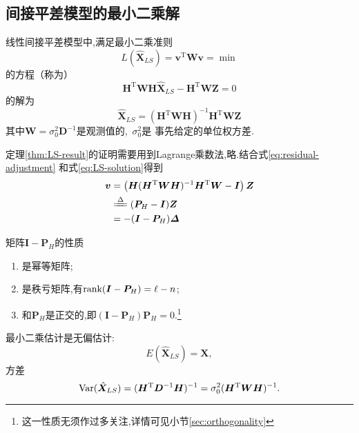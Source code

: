 \documentclass[cn,10pt,citestyle=gb7714-2015,bibstyle=gb7714-2015]{elegantbook}
\newcommand{\mT}{\mathrm{T}}
\renewcommand{\l}{\ell}
\newcommand{\rank}{\textup{rank}}
\newcommand{\Var}{\textup{Var}}
\begin{document}
\subsection{间接平差模型的最小二乘解}
\begin{theorem}[最小二乘解]\label{thm:LS-result}
  线性间接平差模型中,满足最小二乘准则
  \begin{equation}
    L(\hat{\bm{X}}_{LS})=\bm{v}^\mT\bm{W}\bm{v}=\min
  \end{equation}
  的方程（称为）
  \begin{equation}
    \bm{H}^\mT\bm{W}\bm{H}\hat{\bm{X}}_{LS}-\bm{H}^\mT\bm{W}\bm{Z}=0
  \end{equation}
  的解为
  \begin{equation}\label{eq:LS-solution}
    \hat{\bm{X}}_{LS}=(\bm{H}^\mT\bm{W}\bm{H})^{-1}\bm{H}^\mT\bm{W}\bm{Z}
  \end{equation}
  其中$\bm{W}=\sigma_0^2\bm{D}^{-1}$是观测值的,\ $\sigma_0^2$是
  事先给定的单位权方差.
\end{theorem}
定理\ref{thm:LS-result}的证明需要用到\textup{Lagrange}乘数法,略.结合式\eqref{eq:residual-adjustment}
和式\eqref{eq:LS-solution}得到
\begin{align*}
  \bm{v}&=\left(\bm{H}(\bm{H}^\mT\bm{W}\bm{H})^{-1}\bm{H}^\mT\bm{W}-\bm{I}\right)\bm{Z}\\
  &\xlongequal{\Delta}(\bm{P}_H-\bm{I})\bm{Z}\\
  &=-(\bm{I}-\bm{P}_H)\bm{\varDelta}
\end{align*}
\begin{conclusion}矩阵$\bm{I}-\bm{P}_H$的性质
  \begin{enumerate}
    \item 是幂等矩阵;
    \item 是秩亏矩阵,有$\rank(\bm{I}-\bm{P}_H)=\l-n$;
    \item 和$\bm{P}_H$是正交的,即$(\bm{I}-\bm{P}_H)\bm{P}_H=0$.\footnote{这一性质无须作过多关注,详情可见小节\ref{sec:orthogonality}}
  \end{enumerate}
\end{conclusion}
\begin{theorem}[最小二乘估计的统计特性]\label{thm:LS-EandD}
  最小二乘估计是无偏估计:
  \begin{equation}
    E(\hat{\bm{X}}_{LS})=\bm{X},
  \end{equation}
  方差
  \begin{equation}
    \Var(\hat{\bm{X}}_{LS})=(\bm{H}^\mT\bm{D}^{-1}\bm{H})^{-1}=\sigma_0^2(\bm{H}^\mT\bm{W}\bm{H})^{-1}.
  \end{equation}
\end{theorem}
\end{document}
